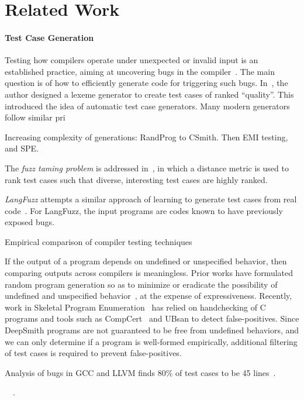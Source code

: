 \section{Related Work}\label{sec:rw}

\paragraph{Test Case Generation} 
Testing how compilers operate under unexpected or invalid input is an established practice, aiming at uncovering bugs in the compiler~\cite{Boujarwah1997}. The main question is of how to efficiently generate code for triggering such bugs. In~\cite{McKeeman1998}, the author designed a lexeme generator to create test cases of ranked ``quality''. This introduced the idea of automatic test case generators. Many modern generators follow similar pri

Increasing complexity of generations: RandProg to CSmith. Then EMI testing, and SPE.

The \emph{fuzz taming problem} is addressed in~\cite{Chen2013}, in which a distance metric is used to rank test cases such that diverse, interesting test cases are highly ranked.

\emph{LangFuzz} attempts a similar approach of learning to generate test cases from real code~\cite{Holler2012}. For LangFuzz, the input programs are codes known to have previously exposed bugs.

Empirical comparison of compiler testing techniques~\cite{Chen2014a}

 If the output of a program depends on undefined or unspecified behavior, then comparing outputs across compilers is meaningless. Prior works have formulated random program generation so as to minimize or eradicate the possibility of undefined and unspecified behavior~\cite{Yang2011c,Le2013a,Le2015}, at the expense of expressiveness. Recently, work in Skeletal Program Enumeration~\cite{Zhang2017a} has relied on handchecking of C programs and tools such as CompCert~\cite{Leroy2013} and UBsan to detect false-positives. Since DeepSmith programs are not guaranteed to be free from undefined behaviors, and we can only determine if a program is well-formed empirically, additional filtering of test cases is required to prevent false-positives.

Analysis of bugs in GCC and LLVM finds 80\% of test cases to be 45 lines~\cite{Sun2016}.

~\cite{Godefroid2008a,Le2015,Sun2016a}~\cite{Kossatchev2005}.

